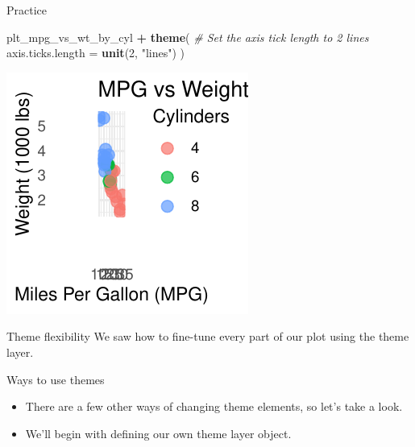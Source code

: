 \documentclass[
  ignorenonframetext,
]{beamer}
\newenvironment{Shaded}{\begin{snugshade}}{\end{snugshade}}
\newcommand{\AttributeTok}[1]{\textcolor[rgb]{0.13,0.29,0.53}{#1}}
\newcommand{\CommentTok}[1]{\textcolor[rgb]{0.56,0.35,0.01}{\textit{#1}}}
\newcommand{\DecValTok}[1]{\textcolor[rgb]{0.00,0.00,0.81}{#1}}
\newcommand{\FunctionTok}[1]{\textcolor[rgb]{0.13,0.29,0.53}{\textbf{#1}}}
\newcommand{\NormalTok}[1]{#1}
\newcommand{\SpecialCharTok}[1]{\textcolor[rgb]{0.81,0.36,0.00}{\textbf{#1}}}
\newcommand{\StringTok}[1]{\textcolor[rgb]{0.31,0.60,0.02}{#1}}
\providecommand{\tightlist}{%
  \setlength{\itemsep}{0pt}\setlength{\parskip}{0pt}}
\begin{document}
\begin{frame}[fragile]{Practice}
\begin{Shaded}
\begin{Highlighting}[]
\NormalTok{plt\_mpg\_vs\_wt\_by\_cyl }\SpecialCharTok{+}
  \FunctionTok{theme}\NormalTok{(}
    \CommentTok{\# Set the axis tick length to 2 lines}
    \AttributeTok{axis.ticks.length =} \FunctionTok{unit}\NormalTok{(}\DecValTok{2}\NormalTok{, }\StringTok{"lines"}\NormalTok{)}
\NormalTok{  )}
\end{Highlighting}
\end{Shaded}

\begin{center}\includegraphics[width=0.5\linewidth]{Figs/unnamed-chunk-72-2} \end{center}
\end{frame}

\begin{frame}{Theme flexibility}
\label{theme-flexibility}
We saw how to fine-tune every part of our plot using the theme layer.
\end{frame}

\begin{frame}{Ways to use themes}
\label{ways-to-use-themes}
\begin{itemize}
\tightlist
\item
  There are a few other ways of changing theme elements, so let's take a
  look.
\item
  We'll begin with defining our own theme layer object.
\end{itemize}
\end{frame}
\end{document}
